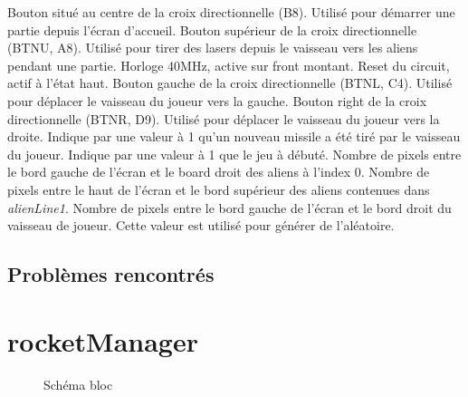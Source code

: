 \documentclass[french]{nakrule}
\begin{document}
\begin{descr}
   Bouton situé au centre de la croix directionnelle (B8).
  Utilisé pour démarrer une partie depuis l'écran d'accueil.
   Bouton supérieur de la croix directionnelle (BTNU, A8).
  Utilisé pour tirer des lasers depuis le vaisseau vers les aliens pendant une partie.
   Horloge 40MHz, active sur front montant.
   Reset du circuit, actif à l'état haut.
   Bouton gauche de la croix directionnelle (BTNL, C4). Utilisé
  pour déplacer le vaisseau du joueur vers la gauche.
   Bouton right de la croix directionnelle (BTNR, D9). Utilisé
  pour déplacer le vaisseau du joueur vers la droite.
   Indique par une valeur à 1 qu'un nouveau missile a été
  tiré par le vaisseau du joueur.
   Indique par une valeur à 1 que le jeu à débuté.
   Nombre de pixels entre le bord gauche de l'écran et le
  board droit des aliens à l'index 0.
   Nombre de pixels entre le haut de l'écran et le bord
  supérieur des aliens contenues dans \emph{alienLine1}.
   Nombre de pixels entre le bord gauche de l'écran et
  le bord droit du vaisseau de joueur. Cette valeur est utilisé pour générer de l'aléatoire.
\end{descr}


\subsection{Problèmes rencontrés}
\label{subsec:Problèmes_rencontrés_alienRocket}

\clearpage

\section{rocketManager}
\label{sec:rocketmanager}

\begin{figure}
\caption{Schéma bloc}
\label{rocketManagerBloc}
\end{figure}
\end{document}
